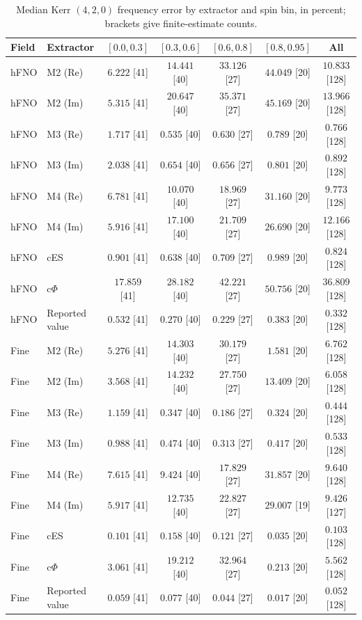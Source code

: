 \begin{table}[!htbp]
\centering
\caption{Median Kerr $(4,2,0)$ frequency error by extractor and spin
bin, in percent; brackets give finite-estimate counts.}
\label{tab:kerr-extractors-omega}
\footnotesize
\setlength{\tabcolsep}{4pt}
\begin{tabular*}{\textwidth}{@{\extracolsep{\fill}}llccccc@{}}
\toprule
Field & Extractor & $[0.0,0.3]$ & $[0.3,0.6]$ & $[0.6,0.8]$
 & $[0.8,0.95]$ & All \\
\midrule
hFNO & M2 (Re) & $6.222$ [41] & $14.441$ [40] & $33.126$ [27] & $44.049$ [20] & $10.833$ [128] \\
hFNO & M2 (Im) & $5.315$ [41] & $20.647$ [40] & $35.371$ [27] & $45.169$ [20] & $13.966$ [128] \\
hFNO & M3 (Re) & $1.717$ [41] & $0.535$ [40] & $0.630$ [27] & $0.789$ [20] & $0.766$ [128] \\
hFNO & M3 (Im) & $2.038$ [41] & $0.654$ [40] & $0.656$ [27] & $0.801$ [20] & $0.892$ [128] \\
hFNO & M4 (Re) & $6.781$ [41] & $10.070$ [40] & $18.969$ [27] & $31.160$ [20] & $9.773$ [128] \\
hFNO & M4 (Im) & $5.916$ [41] & $17.100$ [40] & $21.709$ [27] & $26.690$ [20] & $12.166$ [128] \\
hFNO & cES & $0.901$ [41] & $0.638$ [40] & $0.709$ [27] & $0.989$ [20] & $0.824$ [128] \\
hFNO & c$\Phi$ & $17.859$ [41] & $28.182$ [40] & $42.221$ [27] & $50.756$ [20] & $36.809$ [128] \\
hFNO & Reported value & $0.532$ [41] & $0.270$ [40] & $0.229$ [27] & $0.383$ [20] & $0.332$ [128] \\
\midrule
Fine & M2 (Re) & $5.276$ [41] & $14.303$ [40] & $30.179$ [27] & $1.581$ [20] & $6.762$ [128] \\
Fine & M2 (Im) & $3.568$ [41] & $14.232$ [40] & $27.750$ [27] & $13.409$ [20] & $6.058$ [128] \\
Fine & M3 (Re) & $1.159$ [41] & $0.347$ [40] & $0.186$ [27] & $0.324$ [20] & $0.444$ [128] \\
Fine & M3 (Im) & $0.988$ [41] & $0.474$ [40] & $0.313$ [27] & $0.417$ [20] & $0.533$ [128] \\
Fine & M4 (Re) & $7.615$ [41] & $9.424$ [40] & $17.829$ [27] & $31.857$ [20] & $9.640$ [128] \\
Fine & M4 (Im) & $5.917$ [41] & $12.735$ [40] & $22.827$ [27] & $29.007$ [19] & $9.426$ [127] \\
Fine & cES & $0.101$ [41] & $0.158$ [40] & $0.121$ [27] & $0.035$ [20] & $0.103$ [128] \\
Fine & c$\Phi$ & $3.061$ [41] & $19.212$ [40] & $32.964$ [27] & $0.213$ [20] & $5.562$ [128] \\
Fine & Reported value & $0.059$ [41] & $0.077$ [40] & $0.044$ [27] & $0.017$ [20] & $0.052$ [128] \\
\bottomrule
\end{tabular*}
\end{table}

